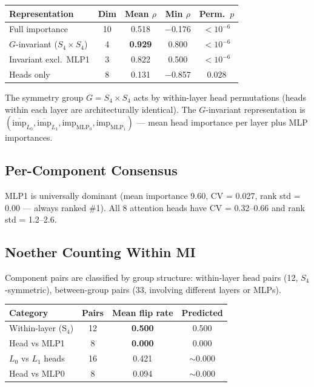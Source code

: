 \documentclass[11pt]{article}
\begin{document}
\begin{center}
\begin{tabular}{lcccc}
\toprule
Representation & Dim & Mean $\rho$ & Min $\rho$ & Perm.\ $p$ \\
\midrule
Full importance & 10 & 0.518 & $-$0.176 & $< 10^{-6}$ \\
$G$-invariant ($S_4 \times S_4$) & 4 & \textbf{0.929} & 0.800 & $< 10^{-6}$ \\
Invariant excl.\ MLP1 & 3 & 0.822 & 0.500 & $< 10^{-6}$ \\
Heads only & 8 & 0.131 & $-$0.857 & 0.028 \\
\bottomrule
\end{tabular}
\end{center}

The symmetry group $G = S_4 \times S_4$ acts by within-layer head permutations (heads within each layer are architecturally identical). The $G$-invariant representation is $(\overline{\mathrm{imp}}_{L_0}, \overline{\mathrm{imp}}_{L_1}, \mathrm{imp}_{\mathrm{MLP}_0}, \mathrm{imp}_{\mathrm{MLP}_1})$ --- mean head importance per layer plus MLP importances.

\subsection{Per-Component Consensus}

MLP1 is universally dominant (mean importance 9.60, CV = 0.027, rank std = 0.00 --- always ranked \#1). All 8 attention heads have CV = 0.32--0.66 and rank std = 1.2--2.6.

\subsection{Noether Counting Within MI}

Component pairs are classified by group structure: within-layer head pairs (12, $S_4$-symmetric), between-group pairs (33, involving different layers or MLPs).

\begin{center}
\begin{tabular}{lccc}
\toprule
Category & Pairs & Mean flip rate & Predicted \\
\midrule
Within-layer (S$_4$) & 12 & \textbf{0.500} & 0.500 \\
Head vs MLP1 & 8 & \textbf{0.000} & 0.000 \\
$L_0$ vs $L_1$ heads & 16 & 0.421 & $\sim$0.000 \\
Head vs MLP0 & 8 & 0.094 & $\sim$0.000 \\
\bottomrule
\end{tabular}
\end{center}
\end{document}
